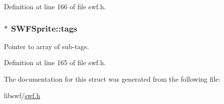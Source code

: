 Definition at line 166 of file swf.\+h.

\hypertarget{struct_s_w_f_sprite_ade3a1182fa49e25d252ade80aac6f873}{}
\subsubsection[{tags}]{$\ast$ S\+W\+F\+Sprite\+::tags}\label{struct_s_w_f_sprite_ade3a1182fa49e25d252ade80aac6f873}


Pointer to array of sub-\/tags. 



Definition at line 165 of file swf.\+h.



The documentation for this struct was generated from the following file\+:\begin{DoxyCompactItemize}
\item 
libswf/\hyperlink{swf_8h}{swf.\+h}\end{DoxyCompactItemize}
